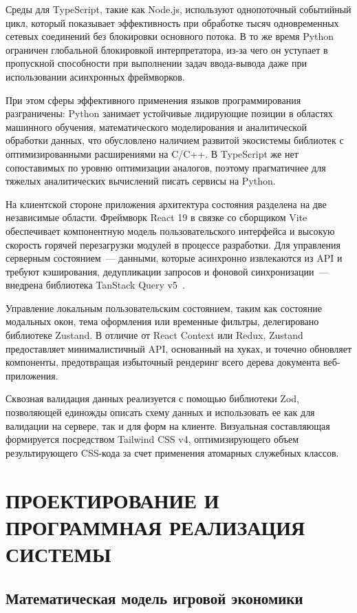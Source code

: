 \documentclass[a4paper,14pt]{extreport}
\begin{document}
Среды для TypeScript, такие как Node.js, используют однопоточный событийный цикл, который показывает эффективность при обработке тысяч одновременных сетевых соединений без блокировки основного потока. В то же время Python ограничен глобальной блокировкой интерпретатора, из-за чего он уступает в пропускной способности при выполнении задач ввода-вывода даже при использовании асинхронных фреймворков.

При этом сферы эффективного применения языков программирования разграничены: Python занимает устойчивые лидирующие позиции в областях машинного обучения, математического моделирования и аналитической обработки данных, что обусловлено наличием развитой экосистемы библиотек с оптимизированными расширениями на C/C++. В TypeScript же нет сопоставимых по уровню оптимизации аналогов, поэтому прагматичнее для тяжелых аналитических вычислений писать сервисы на Python.

На клиентской стороне приложения архитектура состояния разделена на две независимые области. Фреймворк React 19 в связке со сборщиком Vite обеспечивает компонентную модель пользовательского интерфейса и высокую скорость горячей перезагрузки модулей в процессе разработки. Для управления серверным состоянием~--- данными, которые асинхронно извлекаются из API и требуют кэширования, дедупликации запросов и фоновой синхронизации~--- внедрена библиотека TanStack Query v5~\cite{ref21}.

Управление локальным пользовательским состоянием, таким как состояние модальных окон, тема оформления или временные фильтры, делегировано библиотеке Zustand. В отличие от React Context или Redux, Zustand предоставляет минималистичный API, основанный на хуках, и точечно обновляет компоненты, предотвращая избыточный рендеринг всего дерева документа веб-приложения.

Сквозная валидация данных реализуется с помощью библиотеки Zod, позволяющей единожды описать схему данных и использовать ее как для валидации на сервере, так и для форм на клиенте. Визуальная составляющая формируется посредством Tailwind CSS v4, оптимизирующего объем результирующего CSS-кода за счет применения атомарных служебных классов.

\newpage

\chapter{ПРОЕКТИРОВАНИЕ И ПРОГРАММНАЯ РЕАЛИЗАЦИЯ СИСТЕМЫ}

\section{Математическая модель игровой экономики}
\end{document}
